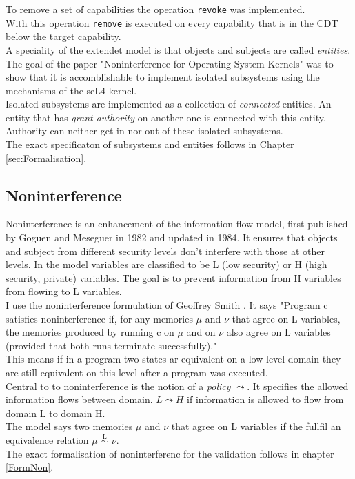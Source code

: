 \documentclass[11pt,a4paper,twoside]{article}
\begin{document}
	To remove a set of capabilities the operation \texttt{revoke} was implemented. \\ 
	With this operation \texttt{remove} is executed on every capability that is in the CDT below the target capability. \\
	A speciality of the extendet model is that objects and subjects are called \textit{entities}.\\
	The goal of the paper "Noninterference for Operating System Kernels" was to show that it is accomblishable to implement isolated subsystems using the mechanisms of the seL4 kernel. \cite{TakeG} \\
	Isolated subsystems are implemented as a collection of \textit{connected} entities. An entity that has \textit{grant authority} on another one is connected with this entity. Authority can neither get in nor out of these isolated subsystems.\\
	The exact specificaton of subsystems and entities follows in Chapter \ref{sec:Formalisation}.
	
	\subsection{Noninterference}
	Noninterference is an enhancement of the information flow model, first published by Goguen and Meseguer in 1982 and updated in 1984. It ensures that objects and subject from different security levels don't interfere with those at other levels. In the model variables are classified to be L (low security) or H (high security, private) variables. The goal is to prevent information from H variables from flowing to L variables. \\
	I use the noninterference formulation of Geoffrey Smith \cite{InfFlow}. It says "Program c satisfies noninterference if, for
any memories $\mu$ and $\nu$ that agree on L variables, the memories produced by
running c on $\mu$ and on $\nu$ also agree on L variables (provided that both runs
terminate successfully)." \\
This means if in a program two states ar equivalent on a low level domain they are still equivalent on this level after a program was executed.\\
Central to to noninterference is the notion of a \textit{policy} $\leadsto$. It specifies the allowed information  flows between domain. $L \leadsto H$ if information is allowed to flow from domain L to domain H. \\
The model says two memories $\mu$ and $\nu$ that agree on L variables if the fullfil an equivalence relation $\mu$ $\overset{\text{L}}{\sim}$ $\nu$. \\
	The exact formalisation of noninterferenc for the validation follows in chapter \ref{FormNon}.
	\newpage
\end{document}
